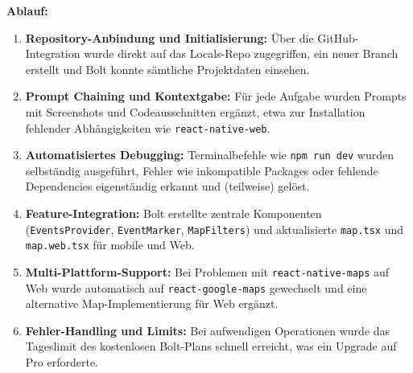 \textbf{Ablauf:}
\begin{enumerate}
      \item \textbf{Repository-Anbindung und Initialisierung:} Über die GitHub-Integration wurde direkt auf das Locals-Repo zugegriffen, ein neuer Branch erstellt und Bolt konnte sämtliche Projektdaten einsehen.
      \item \textbf{Prompt Chaining und Kontextgabe:} Für jede Aufgabe wurden Prompts mit Screenshots und Codeausschnitten ergänzt, etwa zur Installation fehlender Abhängigkeiten wie \texttt{react-native-web}.
      \item \textbf{Automatisiertes Debugging:} Terminalbefehle wie \texttt{npm run dev} wurden selbständig ausgeführt, Fehler wie inkompatible Packages oder fehlende Dependencies eigenständig erkannt und (teilweise) gelöst.
      \item \textbf{Feature-Integration:} Bolt erstellte zentrale Komponenten (\texttt{EventsProvider}, \texttt{EventMarker}, \texttt{MapFilters}) und aktualisierte \texttt{map.tsx} und \texttt{map.web.tsx} für mobile und Web.
      \item \textbf{Multi-Plattform-Support:} Bei Problemen mit \texttt{react-native-maps} auf Web wurde automatisch auf \texttt{react-google-maps} gewechselt und eine alternative Map-Implementierung für Web ergänzt.
      \item \textbf{Fehler-Handling und Limits:} Bei aufwendigen Operationen wurde das Tageslimit des kostenlosen Bolt-Plans schnell erreicht, was ein Upgrade auf Pro erforderte.
\end{enumerate}

